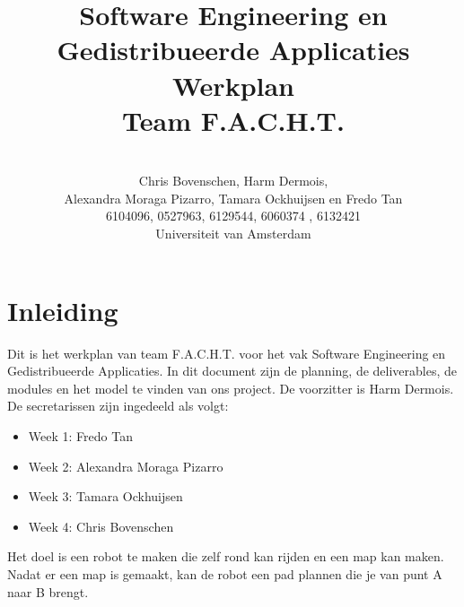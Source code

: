 \documentclass[a4paper,10pt]{article}
\title{Software Engineering en Gedistribueerde Applicaties \\[10pt]Werkplan\\[25pt]Team F.A.C.H.T.}
\author{\\Chris Bovenschen, Harm Dermois, \\Alexandra Moraga Pizarro, Tamara Ockhuijsen en Fredo Tan \\[10pt]6104096, 0527963, 6129544, 6060374 , 6132421 \\[25pt]Universiteit van Amsterdam}
\begin{document}
\maketitle

\newpage
\tableofcontents

\newpage
\section{Inleiding}
Dit is het werkplan van team F.A.C.H.T. voor het vak Software Engineering en Gedistribueerde
Applicaties. In dit document zijn de planning, de deliverables, de modules en het model te vinden van ons project. De voorzitter is Harm Dermois. De secretarissen zijn ingedeeld als volgt:
\begin{itemize}
\item Week 1: Fredo Tan
\item Week 2: Alexandra Moraga Pizarro
\item Week 3: Tamara Ockhuijsen
\item Week 4: Chris Bovenschen
\end{itemize}
Het doel is een robot te maken die zelf rond kan rijden en een map kan maken. Nadat er een map is gemaakt, kan de robot een pad plannen die je van punt A naar B brengt.
\end{document}
